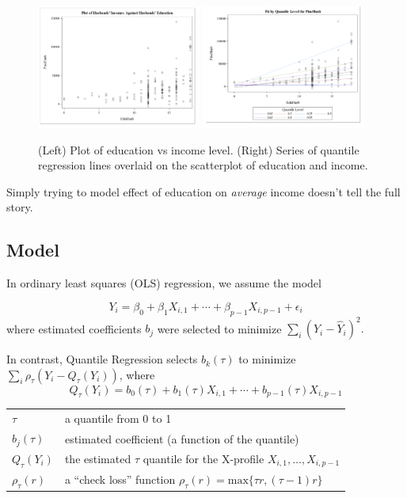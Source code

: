 \documentclass[12pt]{notes}
\begin{document}
\begin{figure}[H]
\includegraphics[width=0.48\textwidth]{figures/module7/education_scatter.png}
\includegraphics[width=0.48\textwidth]{figures/module7/education_scatter_2.png}
\caption{(Left) Plot of education vs income level. (Right) Series of quantile regression lines overlaid on the scatterplot of education and income.}
\label{fig:edscatter}
\end{figure}

\begin{minipage}[l][2cm][c]{\textwidth}
\end{minipage}

\nspace 
Simply trying to model effect of education on \textit{average} income doesn't tell the full story. 

\subsection{Model}
In ordinary least squares (OLS) regression, we assume the model 

$$Y_i = \beta_0 + \beta_1X_{i, 1} + \cdots + \beta_{p-1}X_{i, p-1} + \epsilon_i$$ where estimated coefficients $b_j$ were selected to minimize $\sum_i\left(Y_i - \hat{Y}_i\right)^2.$

\nspace
In contrast, Quantile Regression selects $b_k(\tau)$ to minimize $\sum_i\rho_\tau\left(Y_i - Q_\tau(Y_i)\right)$, where
$$Q_\tau(Y_i) = b_0(\tau) + b_1(\tau)X_{i, 1} + \cdots + b_{p-1}(\tau)X_{i, p-1}$$
\begin{tabular}{ll}
$\tau$ & a quantile from 0 to 1 \\
$b_j(\tau)$ & estimated coefficient (a function of the quantile) \\
$Q_\tau(Y_i)$ & the estimated $\tau$ quantile for the X-profile $X_{i, 1}, \ldots, X_{i, p-1}$ \\
$\rho_\tau(r)$ & a ``check loss'' function $\rho_\tau(r) = \text{max}\{\tau r, (\tau - 1)r\}$
\end{tabular}
\end{document}
